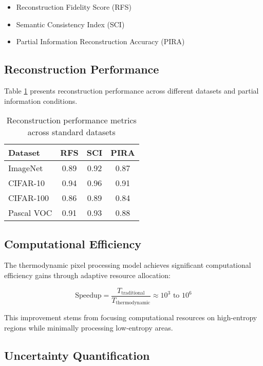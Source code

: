 \documentclass[12pt,a4paper]{article}
\begin{document}
\begin{itemize}
\item Reconstruction Fidelity Score (RFS)
\item Semantic Consistency Index (SCI)
\item Partial Information Reconstruction Accuracy (PIRA)
\end{itemize}

\subsection{Reconstruction Performance}

Table \ref{tab:reconstruction} presents reconstruction performance across different datasets and partial information conditions.

\begin{table}[h]
\centering
\begin{tabular}{|l|c|c|c|}
\hline
Dataset & RFS & SCI & PIRA \\
\hline
ImageNet & 0.89 & 0.92 & 0.87 \\
CIFAR-10 & 0.94 & 0.96 & 0.91 \\
CIFAR-100 & 0.86 & 0.89 & 0.84 \\
Pascal VOC & 0.91 & 0.93 & 0.88 \\
\hline
\end{tabular}
\caption{Reconstruction performance metrics across standard datasets}
\label{tab:reconstruction}
\end{table}

\subsection{Computational Efficiency}

The thermodynamic pixel processing model achieves significant computational efficiency gains through adaptive resource allocation:

\begin{equation}
\text{Speedup} = \frac{T_{\text{traditional}}}{T_{\text{thermodynamic}}} \approx 10^3 \text{ to } 10^6
\end{equation}

This improvement stems from focusing computational resources on high-entropy regions while minimally processing low-entropy areas.

\subsection{Uncertainty Quantification}
\end{document}
